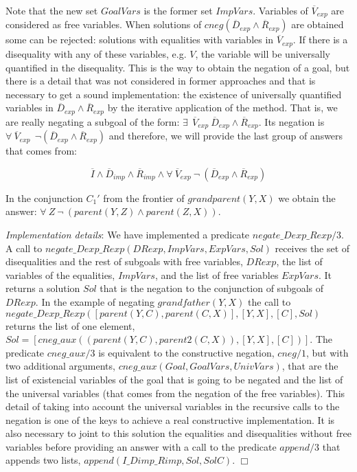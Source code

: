 \documentclass{tlp}
\begin{document}
\begin{itemize}
           Note that the new set $GoalVars$ is the former set
           $ImpVars$. Variables of $\overline{V}_{exp}$ are considered
           as free variables. When solutions of
           $cneg(\overline{D}_{exp} \wedge \overline{R}_{exp})$ are
           obtained some can be rejected: solutions with equalities
           with variables in $\overline{V}_{exp}$. If there is a
           disequality with any of these variables, e.g. $V$, the
           variable will be universally quantified in the disequality.
           This is the way to obtain the negation of a goal, but there
           is a detail that was not considered in former approaches
           and that is necessary to get a sound implementation: the
           existence of universally quantified variables in
           $\overline{D}_{exp} \wedge \overline{R}_{exp}$ by the
           iterative application of the method. That is, we are really
           negating a subgoal of the form: $ \exists~~
           \overline{V}_{exp}~ \overline{D}_{exp} \wedge
           \overline{R}_{exp}$. Its negation is $\forall~
           \overline{V}_{exp}~~ \neg(\overline{D}_{exp} \wedge
           \overline{R}_{exp})$ and therefore, we will provide the
           last group of answers that comes from:

           \[\overline{I} \wedge \overline{D}_{imp}
           \wedge \overline{R}_{imp} \wedge \forall~
           \overline{V}_{exp}~ \neg~(\overline{D}_{exp} \wedge
           \overline{R}_{exp})\]

	   In the conjunction $C_1'$ from the frontier of $grandparent(Y,X)$
           we obtain the answer: $\forall~ Z ~ \neg~(parent(Y,Z) \wedge
           parent(Z,X))$.

\noindent
\emph{Implementation details}: We have implemented a predicate
$negate\_Dexp\_Rexp/3$. A call to
$negate\_Dexp\_Rexp(DRexp,ImpVars,ExpVars,Sol)$ receives the set of
disequalities and the rest of subgoals with free variables, $DRexp$, the list
of variables of the equalities, $ImpVars$, and the list of free variables
$ExpVars$. It returns a solution $Sol$ that is the negation to the conjunction
of subgoals of $DRexp$.  In the example of negating $grandfather(Y,X)$ the
call to $negate\_Dexp\_Rexp([parent(Y,C),parent(C,X)],[Y,X],[C],Sol)$ returns
the list of one element,
$Sol=[cneg\_aux((parent(Y,C),parent2(C,X)),[Y,X],[C])]$. The predicate
$cneg\_aux/3$ is equivalent to the constructive negation, $cneg/1$, but with
two additional arguments, $cneg\_aux(Goal,GoalVars,UnivVars)$, that are the
list of existencial variables of the goal that is going to be negated and the
list of the universal variables (that comes from the negation of the free
variables). This detail of taking into account the universal variables in the
recursive calls to the negation is one of the keys to achieve a real
constructive implementation. It is also necessary to joint to this solution
the equalities and disequalities without free variables before providing an
answer with a call to the predicate $append/3$ that appends two lists,
$append(I\_Dimp\_Rimp,Sol,SolC)$. $\Box$

         \end{itemize}
\end{document}
